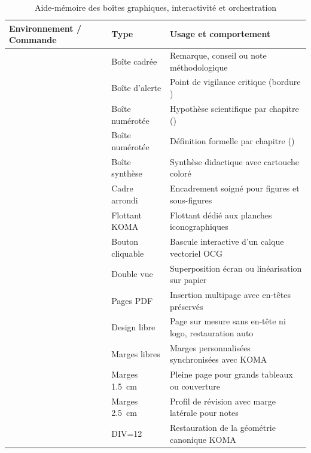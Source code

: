 \begin{table}[htbp]
  \centering
  \small
  \caption{Aide-mémoire des boîtes graphiques, interactivité et orchestration}
  \label{tab:recap-env-outils}
  \begin{tabularx}{\textwidth}{@{} l l Y @{}}
    \toprule
    \textbf{Environnement / Commande} & \textbf{Type} & \textbf{Usage et comportement} \\
    \midrule
     & Boîte cadrée & Remarque, conseil ou note méthodologique \\
     & Boîte d'alerte & Point de vigilance critique (bordure ) \\
     & Boîte numérotée & Hypothèse scientifique par chapitre () \\
     & Boîte numérotée & Définition formelle par chapitre () \\
     & Boîte synthèse & Synthèse didactique avec cartouche coloré \\
       & Cadre arrondi & Encadrement soigné pour figures et sous-figures \\
      & Flottant KOMA & Flottant dédié aux planches iconographiques \\
     & Bouton cliquable & Bascule interactive d'un calque vectoriel OCG \\
     & Double vue & Superposition écran ou linéarisation sur papier \\
     & Pages PDF & Insertion multipage avec en-têtes préservés \\
     & Design libre & Page sur mesure sans en-tête ni logo, restauration auto \\
     & Marges libres & Marges personnalisées synchronisées avec KOMA \\
     & Marges \qty{1.5}{\centi\meter} & Pleine page pour grands tableaux ou couverture \\
      & Marges \qty{2.5}{\centi\meter} & Profil de révision avec marge latérale pour notes \\
     & DIV=12 & Restauration de la géométrie canonique KOMA \\

\end{tabularx}
\end{table}
